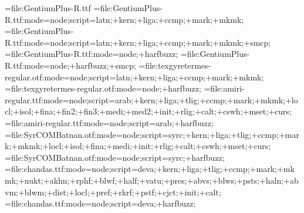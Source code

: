 \parindent=0pt

\font\gentiumOToff={file:GentiumPlus-R.ttf}
\font\gentium={file:GentiumPlus-R.ttf:mode=node;script=latn;+kern;+liga;+ccmp;+mark;+mkmk;}
\font\gentiumSC={file:GentiumPlus-R.ttf:mode=node;script=latn;+kern;+liga;+ccmp;+mark;+mkmk;+smcp;}
\font\gentiumHB={file:GentiumPlus-R.ttf:mode=node;+harfbuzz;}
\font\gentiumHBSC={file:GentiumPlus-R.ttf:mode=node;+harfbuzz;+smcp;}
\font\texgyretermes={file:texgyretermes-regular.otf:mode=node;script=latn;+kern;+liga;+ccmp;+mark;+mkmk;}
\font\texgyretermesHB={file:texgyretermes-regular.otf:mode=node;+harfbuzz;}
\font\amiri={file:amiri-regular.ttf:mode=node;script=arab;+kern;+liga;+tlig;+ccmp;+mark;+mkmk;+locl;+isol;+fina;+fin2;+fin3;+medi;+med2;+init;+rlig;+calt;+cswh;+mset;+curs;}
\font\amiriHB={file:amiri-regular.ttf:mode=node;script=arab;+harfbuzz;}
\font\sertobatnan={file:SyrCOMBatnan.otf:mode=node;script=syrc;+kern;+liga;+tlig;+ccmp;+mark;+mkmk;+locl;+isol;+fina;+medi;+init;+rlig;+calt;+cswh;+mset;+curs;}
\font\sertobatnanHB={file:SyrCOMBatnan.otf:mode=node;script=syrc;+harfbuzz;}
\font\chandas={file:chandas.ttf:mode=node;script=deva;+kern;+liga;+tlig;+ccmp;+mark;+mkmk;+nukt;+akhn;+rphf;+blwf;+half;+vatu;+pres;+abvs;+blws;+psts;+haln;+abvm;+blwm;+dist;+locl;+pref;+rkrf;+pstf;+cjct;+init;+calt;}
\font\chandasHB={file:chandas.ttf:mode=node;script=deva;+harfbuzz;}


\gentium

